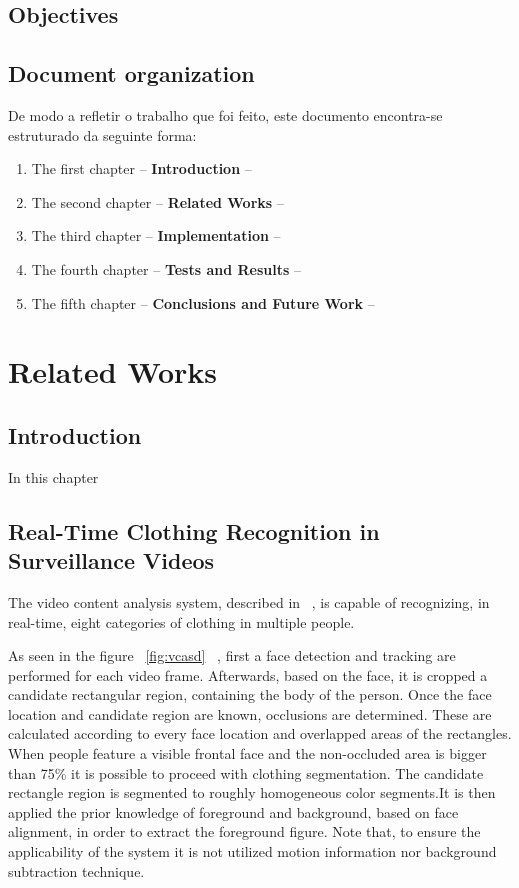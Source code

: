 \documentclass[titlepage,12pt,a4paper,times]{book}
\begin{document}
\section{Objectives}
\label{sec:obj}

\section{Document organization}
\label{sec:organ}
De modo a refletir o trabalho que foi feito, este documento encontra-se
estruturado da seguinte forma:
\begin{enumerate}
\item The first chapter -- \textbf{Introduction} --
\item The second chapter -- \textbf{Related Works} --
\item The third chapter -- \textbf{Implementation} --
\item The fourth chapter -- \textbf{Tests and Results} --
\item The fifth chapter -- \textbf{Conclusions and Future Work} --
\end{enumerate}

\chapter{Related Works}
\label{chap:ow}

\section{Introduction}
\label{chap2:sec:intro}

In this chapter
\section{Real-Time Clothing Recognition in Surveillance Videos}
\label{chap2:sec:art1}

The video content analysis system, described in ~\citep{1}, is capable of
recognizing, in real-time, eight categories of clothing in multiple people.

As seen in the figure ~\ref{fig:vcasd} ~\citep{1}, first a face detection and
tracking are performed for each video frame. Afterwards, based on the face,
it is cropped a candidate rectangular region, containing the body of the
person. Once the face location and candidate region are known, occlusions are
determined. These are calculated according to every face location and
overlapped areas of the rectangles. When people feature a visible frontal
face and the non-occluded area is bigger than 75\% it is possible to proceed
with clothing segmentation. The candidate rectangle region is segmented to
roughly homogeneous color segments.It is then applied the prior knowledge of
foreground and background, based on face alignment, in order to extract the
foreground figure. Note that, to ensure the applicability of the system it is
not utilized motion information nor background subtraction technique.
\end{document}
